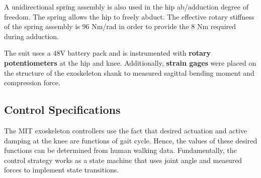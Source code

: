 \begin{refsection}
 A unidirectional spring assembly is also used in the hip ab/adduction degree of freedom.  The spring allows the hip to freely abduct.  The effective rotary stiffness of the spring assembly is 96 Nm/rad in order to provide the 8 Nm required during adduction.

The suit uses a 48V battery pack and is instrumented with \textbf{rotary potentiometers} at the hip and knee.  Additionally, \textbf{strain gages} were placed on the structure of the exoskeleton shank to measured sagittal bending moment and compression force.
 
 
 \subsection{Control Specifications}
 
The MIT exoskeleton controllers use the fact that desired actuation and active damping at the knee are functions of gait cycle.  Hence, the values of these desired functions can be determined from human walking data.  Fundamentally, the control strategy works as a state machine that uses joint angle and measured forces to implement state transitions.


\end{refsection}
